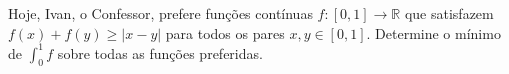 Hoje, Ivan, o Confessor, prefere funções contínuas \(f\colon [0,1]\to\mathbb{R}\) que satisfazem \(f(x)+f(y)\geq |x-y|\) para todos os pares \(x,y\in [0,1]\). Determine o mínimo de \(\int_0^1 f\) sobre todas as funções preferidas.

